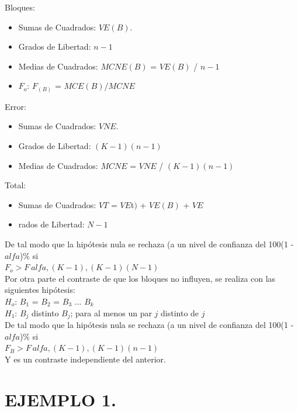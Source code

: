 \documentclass[12pt,letterpaper]{article}\usepackage[]{graphicx}\usepackage[]{color}
\begin{document}
Bloques:
\begin{itemize}
  \item Sumas de Cuadrados: $VE(B)$.
  \item Grados de Libertad: $n - 1$
  \item Medias de Cuadrados: $MCNE(B)$ = $VE(B)$ / $n-1$
  \item $F_o$: $F_(B)$ = $MCE(B)$/$MCNE$
\end{itemize}

Error:
\begin{itemize}
  \item Sumas de Cuadrados: $VNE$.
  \item Grados de Libertad: $(K - 1)(n - 1)$
  \item Medias de Cuadrados: $MCNE$ = $VNE$ / $(K - 1)(n - 1)$
\end{itemize}
Total:
\begin{itemize}
  \item Sumas de Cuadrados: $VT$ = $VE$t$)$ + $VE(B)$ + $VE$
  \item rados de Libertad: $N - 1$
\end{itemize}

De tal modo que la hip\'otesis nula se rechaza (a un nivel de confianza del  100(1 - $alfa$)\% si\\

$F_o$$>$$F_\ alfa,(K-1),(K-1)(N-1)$\\

Por otra parte el contraste de que los bloques no influyen, se realiza con las siguientes hip\'otesis:\\

$H_o$: $B_1$ = $B_2$ = $B_3$ ... $B_k$ \\

$H_1$: $B_j$ distinto $B_j$; para al menos un par $j$ distinto de $j$\\

De tal modo que la hip\'otesis nula se rechaza (a un nivel de confianza del 100(1 - $alfa$)\% si\\

$F_B$$>$$F_\ alfa,(K-1),(K-1)(n-1)$\\

Y es un contraste independiente del anterior.\\ 

\section{EJEMPLO 1.}
\end{document}

